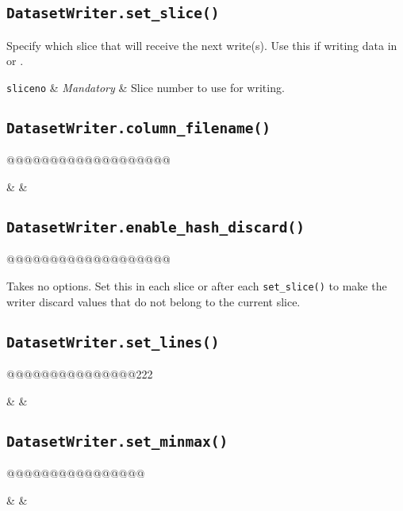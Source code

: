 \subsection{\texttt{DatasetWriter.set\_slice()}}
Specify which slice that will receive the next write(s).  Use this if
writing data in \prepare or \synthesis.
\begin{leftbar}
\starttable
\texttt{sliceno} & \textsl{Mandatory} & Slice number to use for writing.\\
\stoptable
\end{leftbar}


\subsection{\texttt{DatasetWriter.column\_filename()}}
@@@@@@@@@@@@@@@@@@@
\begin{leftbar}
\starttable
\texttt{} & \texttt{} & \\
\stoptable
\end{leftbar}


\subsection{\texttt{DatasetWriter.enable\_hash\_discard()}}
@@@@@@@@@@@@@@@@@@@
\begin{leftbar}
Takes no options.  Set this in each slice or after
each \texttt{set\_slice()} to make the writer discard values that do
not belong to the current slice.
\end{leftbar}


\subsection{\texttt{DatasetWriter.set\_lines()}}
@@@@@@@@@@@@@@@222
\begin{leftbar}
\starttable
\texttt{} & \texttt{} & \\
\stoptable
\end{leftbar}


\subsection{\texttt{DatasetWriter.set\_minmax()}}
@@@@@@@@@@@@@@@@
\begin{leftbar}
\starttable
\texttt{} & \texttt{} & \\
\stoptable
\end{leftbar}



